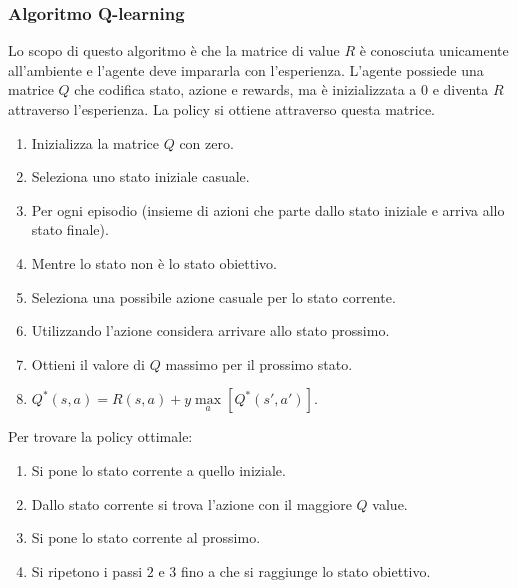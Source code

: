 \subsubsection{Algoritmo Q-learning}
Lo scopo di questo algoritmo \`e che la matrice di value $R$ \`e conosciuta unicamente all'ambiente e l'agente deve impararla con l'esperienza.
L'agente possiede una matrice $Q$ che codifica stato, azione e rewards, ma \`e inizializzata a $0$ e diventa $R$ attraverso l'esperienza.
La policy si ottiene attraverso questa matrice.
\begin{enumerate}
	\item Inizializza la matrice $Q$ con zero.
	\item Seleziona uno stato iniziale casuale.
	\item Per ogni episodio (insieme di azioni che parte dallo stato iniziale e arriva allo stato finale).
	\item Mentre lo stato non \`e lo stato obiettivo.
	\item Seleziona una possibile azione casuale per lo stato corrente.
	\item Utilizzando l'azione considera arrivare allo stato prossimo.
	\item Ottieni il valore di $Q$ massimo per il prossimo stato.
	\item $Q^*(s,a) = R(s,a)+y\max\limits_a[Q^*(s',a')]$.
\end{enumerate}
Per trovare la policy ottimale:
\begin{enumerate}
	\item Si pone lo stato corrente a quello iniziale.
	\item Dallo stato corrente si trova l'azione con il maggiore $Q$ value.
	\item Si pone lo stato corrente al prossimo.
	\item Si ripetono i passi $2$ e $3$ fino a che si raggiunge lo stato obiettivo.
\end{enumerate}

